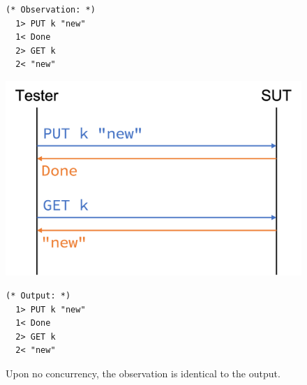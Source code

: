 \begin{figure}
  \centering
  \begin{minipage}[c]{.3\textwidth}
\begin{lstlisting}[style=customcoq]
  (* Observation: *)
  1> PUT k "new"
  1< Done
  2> GET k
  2< "new"
\end{lstlisting}
  \end{minipage}\begin{minipage}[c]{.4\textwidth}
  \includegraphics[width=\linewidth]{figures/linear-trace}
  \end{minipage}\begin{minipage}[c]{.3\textwidth}
\begin{lstlisting}[style=customcoq]
  (* Output: *)
  1> PUT k "new"
  1< Done
  2> GET k
  2< "new"
\end{lstlisting}
  \end{minipage}
  \caption[Linear trace upon no concurrency.]{Upon no concurrency, the
    observation is identical to the output.}
  \label{fig:linear-trace}
\end{figure}
